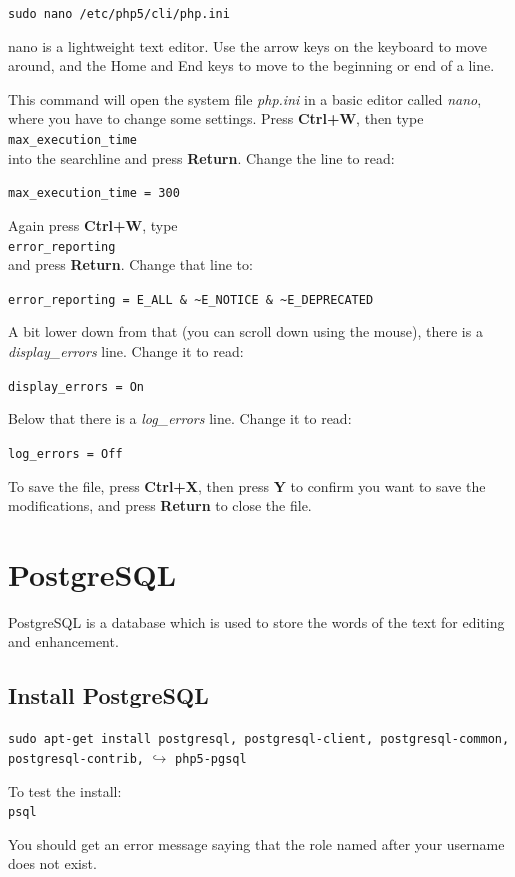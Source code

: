 \verb|sudo nano /etc/php5/cli/php.ini|

nano is a lightweight text editor.  Use the arrow keys on the keyboard to move around, and the Home and End keys to move to the beginning or end of a line.

This command will open the system file \textit{php.ini} in a basic editor called \textit{nano}, where you have to change some settings. Press \textbf{Ctrl+W}, then type\\
\verb|max_execution_time|\\
into the searchline and press \textbf{Return}. Change the line to read:

\verb|max_execution_time = 300|

Again press \textbf{Ctrl+W}, type\\
\verb|error_reporting| \\
and press \textbf{Return}. Change that line to: 

\verb|error_reporting = E_ALL & ~E_NOTICE & ~E_DEPRECATED|

A bit lower down from that (you can scroll down using the mouse), there is a \textit{display\_errors} line. Change it to read: 

\verb|display_errors = On|

Below that there is a \textit{log\_errors} line. Change it to read: 

\verb|log_errors = Off|

To save the file, press \textbf{Ctrl+X}, then press \textbf{Y} to confirm you want to save the modifications, and press \textbf{Return} to close the file.


\section{PostgreSQL}

PostgreSQL is a database which is used to store the words of the text for editing and enhancement.


\subsection{Install PostgreSQL}

\verb|sudo apt-get install postgresql, postgresql-client, postgresql-common, postgresql-contrib,|
$\hookrightarrow$ \verb|php5-pgsql|

To test the install:\\
\verb|psql|

You should get an error message saying that the role named after your username does not exist.


